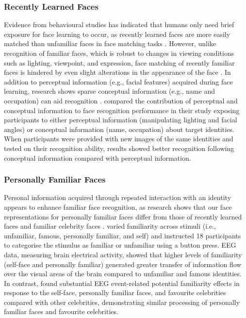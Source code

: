 \documentclass[
  authoryear,
  review,
  3p,
  onecolumn]{elsarticle}
\begin{document}
\subsubsection{Recently Learned Faces}\label{recently-learned-faces}

Evidence from behavioural studies has indicated that humans only need
brief exposure for face learning to occur, as recently learned faces are
more easily matched than unfamiliar faces in face matching tasks
\citep{dowsett2016a, kramer2017a, murphy2015a, quek2021a}. However,
unlike recognition of familiar faces, which is robust to changes in
viewing conditions such as lighting, viewpoint, and expression, face
matching of recently familiar faces is hindered by even slight
alterations in the appearance of the face
\citep{burton2011a, redfern2019a, megraya2008a, white2016a}. In addition
to perceptual information (e.g., facial features) acquired during face
learning, research shows sparse conceptual information (e.g., name and
occupation) can aid recognition \citep{oruc2019a, schwartz2019a}.
\citet{schwartz2016a} compared the contribution of perceptual and
conceptual information to face recognition performance in their study
exposing participants to either perceptual information (manipulating
lighting and facial angles) or conceptual information (name, occupation)
about target identities. When participants were provided with new images
of the same identities and tested on their recognition ability, results
showed better recognition following conceptual information compared with
perceptual information.

\subsubsection{Personally Familiar
Faces}\label{personally-familiar-faces}

Personal information acquired through repeated interaction with an
identity appears to enhance familiar face recognition, as research shows
that our face representations for personally familiar faces differ from
those of recently learned faces and familiar celebrity faces
\citep{cloutier2011a, ramon2017a, rooney2012a}.
\citet{karimi-rouzbahani2021a} varied familiarity across stimuli (i.e.,
unfamiliar, famous, personally familiar, and self) and instructed 18
participants to categorise the stimulus as familiar or unfamiliar using
a button press. EEG data, measuring brain electrical activity, showed
that higher levels of familiarity (self-face and personally familiar)
generated greater transfer of information flow over the visual areas of
the brain compared to unfamiliar and famous identities. In contrast,
\citet{wiese2021a} found substantial EEG event-related potential
familiarity effects in response to the self-face, personally familiar
faces, and favourite celebrities compared with other celebrities,
demonstrating similar processing of personally familiar faces and
favourite celebrities.
\end{document}
